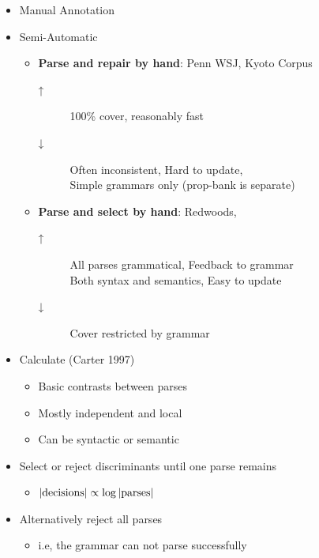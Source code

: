 \documentclass[a4paper,landscape,headrule,footrule,xetex]{foils}
\begin{document}

\begin{itemize}
\item Manual Annotation
\item Semi-Automatic 
  \begin{itemize}
  \item \textbf{Parse and repair by hand}: Penn WSJ, Kyoto Corpus
    \begin{description}
    \item [↑] 100\% cover, reasonably fast
    \item [↓] Often inconsistent, Hard to update,   \\
      Simple grammars only (prop-bank is separate)
    \end{description}
  \item \textbf{Parse and select by hand}: Redwoods, 
    \begin{description}
    \item [↑] All parses grammatical, Feedback to grammar
      \\ Both syntax and semantics, Easy to update
    \item [↓] Cover restricted by grammar
    \end{description}
  \end{itemize}
\end{itemize}

\begin{itemize}
\item Calculate  (Carter 1997)
  \begin{itemize}
  \item Basic contrasts between parses
  \item Mostly independent and local
  \item Can be syntactic or semantic
  \end{itemize}
\item Select or reject discriminants until one parse remains
  \begin{itemize}
  \item $|{\textnormal{decisions}| \propto \log |\textnormal{parses}|}$
  \end{itemize}
\item Alternatively reject all parses
  \begin{itemize}
  \item i.e, the grammar can not parse successfully
  \end{itemize}
\end{itemize}
\end{document}
